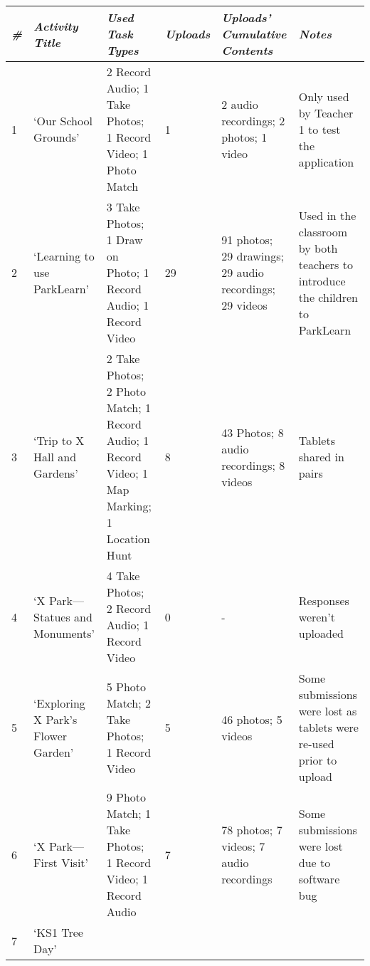 \begin{table}[]
    \centering
    \begin{tabularx}{\linewidth}{ 
| p{3mm} 
| >{\raggedright\arraybackslash}X 
| >{\raggedright\arraybackslash}X 
| p{13mm}
| >{\raggedright\arraybackslash}X 
| >{\raggedright\arraybackslash}X 
|}
\hline
\small\textit{\#}
    & \small\textit{Activity Title} 
    & \small\textit{Used Task Types}
    & \small\textit{Uploads}
    & \small\textit{Uploads' Cumulative Contents}
    & \small\textit{Notes}\\
\hline
\small 1 
    & \footnotesize `Our School Grounds' 
    & \footnotesize 2 Record Audio; 1 Take Photos; 1 Record Video; 1 Photo Match 
    & \footnotesize 1  
    & \footnotesize 2 audio recordings; 2 photos; 1 video
    & \footnotesize Only used by Teacher 1 to test the application\\
\hline
\small 2
    & \footnotesize `Learning to use ParkLearn' 
    & \footnotesize 3 Take Photos; 1 Draw on Photo; 1 Record Audio; 1 Record Video 
    & \footnotesize 29  
    & \footnotesize 91 photos; 29 drawings; 29 audio recordings; 29 videos
    & \footnotesize Used in the classroom by both teachers to introduce the children to ParkLearn\\
\hline
\small 3
    & \footnotesize `Trip to X Hall and Gardens' 
    & \footnotesize 2 Take Photos; 2 Photo Match; 1 Record Audio; 1 Record Video; 1 Map Marking; 1 Location Hunt 
    & \footnotesize 8  
    & \footnotesize 43 Photos; 8 audio recordings; 8 videos
    & \footnotesize Tablets shared in pairs\\
\hline
\small 4 
    & \footnotesize `X Park---Statues and Monuments' 
    & \footnotesize 4 Take Photos; 2 Record Audio; 1 Record Video
    & \footnotesize 0  
    & \footnotesize -
    & \footnotesize Responses weren't uploaded\\
\hline
    \small 5 
    & \footnotesize `Exploring X Park's Flower Garden' 
    & \footnotesize 5 Photo Match; 2 Take Photos; 1 Record Video
    & \footnotesize 5 
    & \footnotesize 46 photos; 5 videos
    & \footnotesize Some submissions were lost as tablets were re-used prior to upload\\
\hline
    \small 6 
    & \footnotesize `X Park---First Visit' 
    & \footnotesize 9 Photo Match; 1 Take Photos; 1 Record Video; 1 Record Audio
    & \footnotesize 7 
    & \footnotesize 78 photos; 7 videos; 7 audio recordings
    & \footnotesize Some submissions were lost due to software bug\\
\hline
    \small 7 
    & \footnotesize `KS1 Tree Day' 

\end{tabularx}
\end{table}
